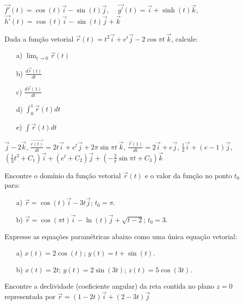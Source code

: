 \begin{resp} $\vec{f'}(t)=\cos(t)\vec{i}-\sin(t)\vec{j}$,~~ $\vec{g'}(t)= \vec{i}+\sinh(t)\vec{k}$, ~~$\vec{h'}(t)=\cos(t)\vec{i}-\sin(t)\vec{j}+\vec{k}$\end{resp}
\begin{exer} Dada a função vetorial $\vec{r}(t)=t^2\vec{i}+e^t\vec{j}-2\cos\pi t ~\! \vec{k}$, calcule:
\begin{itemize}
\item [a)] $\displaystyle \lim_{t\to 0} \vec{r}(t)$
\item [b)] $\displaystyle \frac{d \vec{r}(t)}{dt}$
\item [c)] $\displaystyle \frac{d\vec{r}(1)}{dt}$
\item [d)] $\displaystyle \int_0^1 \vec{r}(t)dt$
\item [e)] $\displaystyle \int \vec{r}(t)dt$
\end{itemize}
\end{exer}
\begin{resp} $\vec{j}-2\vec{k}$, $\frac{\vec{r(t)}}{dt}=2t\vec{i}+e^t\vec{j}+2\pi\sin\pi t ~\! \vec{k}$, $\frac{\vec{r}(1)}{dt}=2\vec{i}+e\vec{j}$, $\frac{1}{3}\vec{i}+(e-1)\vec{j}$, $\left(\frac{1}{3}t^3+C_1\right)\vec{i}+\left(e^t+C_2\right)\vec{j}+\left(-\frac{2}{\pi}\sin\pi t+C_3\right)\vec{k}$
\end{resp}
\begin{exer}Encontre o domínio da função vetorial $\vec{r}(t)$ e o valor da função no ponto $t_0$ para:
\begin{itemize}
 \item[a)] $\vec{r}=\cos(t)\vec{i}-3t\vec{j}$; $t_0=\pi$.
 \item[b)] $\vec{r}=\cos(\pi t)\vec{i}-\ln(t)\vec{j}+\sqrt{t-2}$; $t_0=3$.
\end{itemize}
\end{exer}
\begin{exer}Expresse as equações paramétricas abaixo como uma única equação vetorial:
\begin{itemize}
 \item[a)] $x(t)=2\cos(t)$; $y(t)=t+\sin(t)$.
 \item[b)] $x(t)=2t$; $y(t)=2\sin(3t)$; $z(t)=5\cos(3t)$.
\end{itemize}
\end{exer}
\begin{exer}Encontre a declividade (coeficiente angular) da reta contida no plano $z=0$ representada por $\vec{r}=(1-2t)\vec{i}+(2-3t)\vec{j}$
\end{exer}
